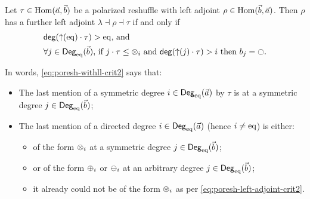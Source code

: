 \documentclass[a4paper]{memoir}
\begin{document}
\begin{theorem} \label{thm:poresh-withll}
	Let $\tau \in {\mathrm{Hom}}(\vec a, \vec b)$ be a polarized reshuffle with left adjoint $\rho \in {\mathrm{Hom}}(\vec b, \vec a)$.
	Then $\rho$ has a further left adjoint $\lambda \dashv \rho \dashv \tau$ if and only if
	\begin{align}
		&\text{$\getdeg(\sucdeg(\eqtydeg) \cdot \tau) > \eqtydeg$, and} \label{eq:poresh-withll-crit1} \\
		&\text{$\forall j \in \Degeq(\vec b)$, if $j \cdot \tau \leq \mixpol_i$ and $\getdeg(\sucdeg(j) \cdot \tau) > i$ then $b_j = \npolar$.} \label{eq:poresh-withll-crit2}
	\end{align}
\end{theorem}
In words, \cref{eq:poresh-withll-crit2} says that:
\begin{itemize}
	\item The last mention of a symmetric degree $i \in {\mathsf{Deg}_{\mathrm{eq}}}(\vec a)$ by $\tau$ is at a symmetric degree $j \in {\mathsf{Deg}_{\mathrm{eq}}}(\vec b)$;
	\item The last mention of a directed degree $i \in {\mathsf{Deg}_{\mathrm{eq}}}(\vec a)$ (hence $i \neq {\mathrm{eq}}$) is either:
	\begin{itemize}
		\item of the form ${\otimes}_i$ at a symmetric degree $j \in {\mathsf{Deg}_{\mathrm{eq}}}(\vec b)$;
		\item or of the form ${\oplus}_i$ or ${\ominus}_i$ at an arbitrary degree $j \in {\mathsf{Deg}_{\mathrm{eq}}}(\vec b)$;
		\item it already could not be of the form ${\oast}_i$ as per \cref{eq:poresh-left-adjoint-crit2}.
	\end{itemize}
\end{itemize}
\end{document}
